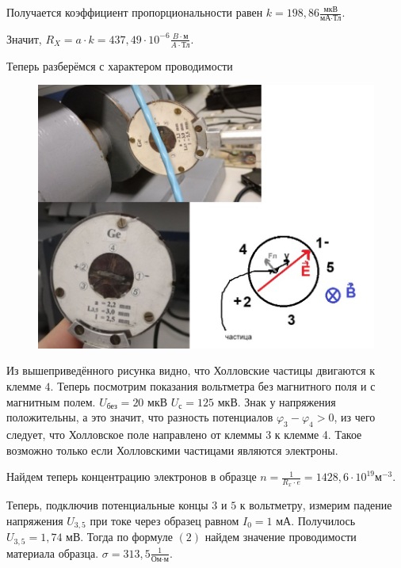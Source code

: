 \documentclass[a4paper,12pt]{article}
\begin{document}
Получается коэффициент пропорциональности равен $k = 198,86 \frac{\text{мкВ}}{\text{мА} \cdot \text{Тл}}$.

Значит, $R_X = a \cdot k = 437,49 \cdot 10^{-6} \frac{B \cdot \text{м}}{A \cdot \text{Тл}}$.

Теперь разберёмся с характером проводимости

\begin{figure}[H]
	\begin{center}	\includegraphics[width=1\textwidth]{last.jpg}
	\end{center}
\end{figure}

Из вышеприведённого рисунка видно, что Холловские частицы двигаются к клемме $4$. Теперь посмотрим показания вольтметра без магнитного поля и с магнитным полем. $U_{\text{без}} = 20$ мкВ $ U_{\text{с}} = 125$ мкВ. Знак у напряжения положительны, а это значит, что разность потенциалов $\varphi_3 - \varphi_4 > 0$, из чего следует, что Холловское поле направлено от клеммы 3 к клемме 4. Такое возможно только если Холловскими частицами являются электроны.

Найдем теперь концентрацию электронов в образце $n = \frac{1}{R_x \cdot e} = 1428,6 \cdot 10^{19} \text{м}^{-3}$.

Теперь, подключив потенциальные концы $3$ и $5$ к вольтметру, измерим падение напряжения $U_{3,5}$ при токе через образец равном $I_0 = 1$ мА. Получилось $U_{3,5} = 1,74$ мВ. Тогда по формуле $(2)$ найдем значение проводимости материала образца. $\sigma = 313,5 \frac{1}{\text{Ом} \cdot \text{м}}$.
\end{document}
